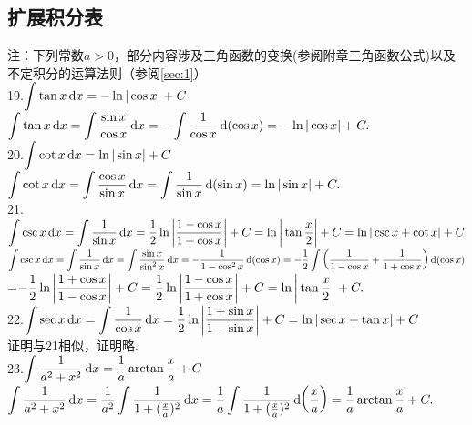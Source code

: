 \subsection{扩展积分表}
\vspace{1em}
\noindent 注：下列常数$a>0$，部分内容涉及三角函数的变换(参阅附章三角函数公式)以及不定积分的运算法则（参阅\ref{sec:1}）\vspace{-0.5em}\\
19.\enspace $\displaystyle\int \tan x \,{\rm{d}} x=-\ln |\cos x|+C$
\vspace{1em}\\ \proof $\displaystyle\int \tan x \,{\rm{d}} x=\int \frac{\sin x}{\cos x} \,{\rm{d}} x=-\int\frac{1}{\cos x} \,{\rm{d}} (\cos x)=-\ln|\cos x|+C.$\\
20.\enspace $\displaystyle\int \cot x \,{\rm{d}} x=\ln |\sin x|+C$
\vspace{1em}\\ \proof $\displaystyle\int \cot x \,{\rm{d}} x=\int \frac{\cos x}{\sin x} \,{\rm{d}} x=\int\frac{1}{\sin x} \,{\rm{d}} (\sin x)=\ln|\sin x|+C.$\vspace{0.5em}\\
21.\enspace $\displaystyle\int \csc x \,{\rm{d}} x=\int\frac{1}{\sin x} \,{\rm{d}} x=\frac{1}{2}\ln \bigg|\frac{1-\cos x}{1+\cos x}\bigg|+C=\ln\bigg |\tan \frac{x}{2}\bigg|+C=\ln|\csc x+\cot x|+C
$
\vspace{1em}\\ \proof $\displaystyle\int \csc x \,{\rm{d}} x=\int \frac{1}{\sin x} \,{\rm{d}} x=\int\frac{\sin x}{\sin^2 x} \,{\rm{d}} x=-\frac{1}{1-\cos^2 x} \,{\rm{d}} (\cos x)=-\frac{1}{2}\int \bigg(\frac{1}{1-\cos x}+\frac{1}{1+\cos x}\bigg) \,{\rm{d}}(\cos x)$\vspace{0.5em}\\
\hspace*{9.5em}=$-\displaystyle\frac{1}{2}\ln \bigg|\displaystyle\frac{1+\cos x}{1-\cos x}\bigg|+C=\displaystyle\frac{1}{2}\ln \bigg|\displaystyle\frac{1-\cos x}{1+\cos x}\bigg|+C=\ln\bigg|\tan \frac{x}{2}\bigg|+C. $
\vspace{1em}\\
22.\enspace $\displaystyle\int \sec x \,{\rm{d}} x=\int\frac{1}{\cos x} \,{\rm{d}} x=\frac{1}{2}\ln \bigg|\frac{1+\sin x}{1-\sin x}\bigg|+C=\ln|\sec x+\tan x|+C
$
\vspace{1em}\\
\proof 证明与21相似，证明略.\vspace{0.5em}\\
23.\enspace $\displaystyle\int\frac{1}{a^2+x^2} \,{\rm{d}} x=\frac{1}{a}\arctan\frac{x}{a}+C$\vspace{1.5em}\\
\proof $\displaystyle\int\frac{1}{a^2+x^2} \,{\rm{d}} x=\frac{1}{a^2}\int\frac{1}{1+(\frac{x}{a})^2} \,{\rm{d}} x=\frac{1}{a}\int\frac{1}{1+(\frac{x}{a})^2}\,{\rm{d}}\bigg(\frac{x}{a}\bigg)=\frac{1}{a}\arctan\frac{x}{a}+C.$

